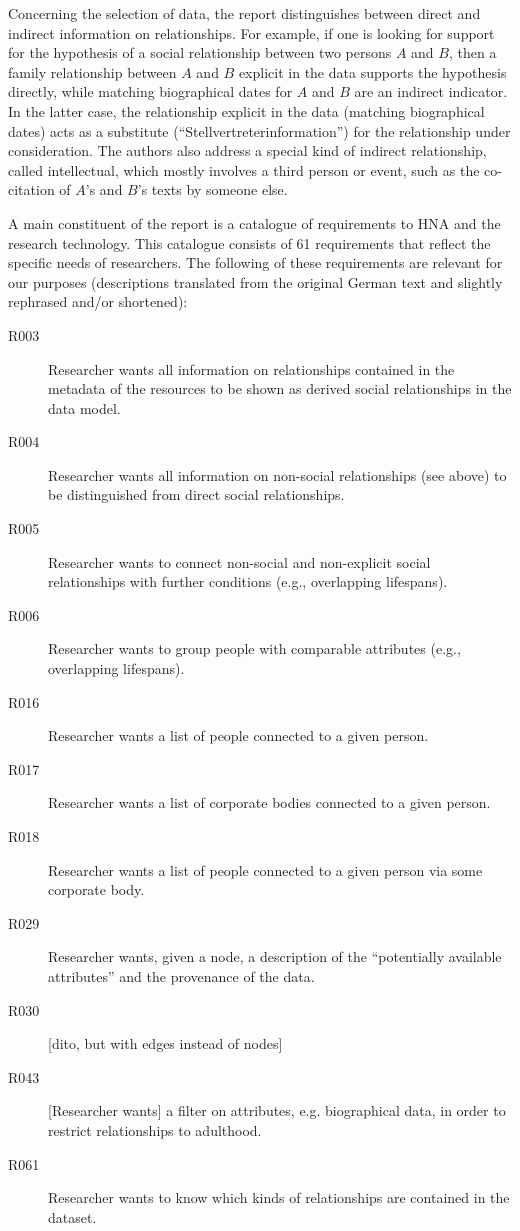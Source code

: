 
Concerning the selection of data, the report distinguishes between
direct and indirect information on relationships.
For example, if one is looking for support for the hypothesis of a social relationship
between two persons $A$ and $B$, then a family relationship between $A$ and $B$ explicit in the data
supports the hypothesis directly, while matching biographical dates for $A$ and $B$
are an indirect indicator. In the latter case, the relationship
explicit in the data (matching biographical dates) acts as a substitute
(\enquote{Stellvertreterinformation}) for the relationship under consideration.
The authors also address a special kind of indirect relationship,
called intellectual, which mostly involves a third person
or event, such as the co-citation of $A$'s and $B$'s texts by someone else.

A main constituent of the report is a catalogue of requirements
to HNA and the research technology. This catalogue consists of 61
requirements that reflect the specific needs of researchers.
The following of these requirements are relevant for our purposes
(descriptions translated from the original German text and slightly rephrased and/or shortened):
%
\begin{description}
  \item[R003]
    Researcher wants all information on relationships contained in the metadata of the resources
    to be shown as derived social relationships in the data model.
  \item[R004]
    Researcher wants all information on non-social
    relationships (see above) to be distinguished from direct social relationships.
  \item[R005]
    Researcher wants to connect non-social and non-explicit social relationships
    with further conditions (e.g., overlapping lifespans).
  \item[R006]
    Researcher wants to group people with comparable attributes (e.g., overlapping lifespans).
  \item[R016]
    Researcher wants a list of people connected to a given person.
  \item[R017]
    Researcher wants a list of corporate bodies connected to a given person.
  \item[R018]
    Researcher wants a list of people connected to a given person via some corporate body.
  \item[R029]
    Researcher wants, given a node, a description of the \enquote{potentially available attributes}
    and the provenance of the data.
  \item[R030]
    [dito, but with edges instead of nodes]
  \item[R043]
    [Researcher wants] a filter on attributes, e.g. biographical data, in order to
    restrict relationships to adulthood.
  \item[R061]
    Researcher wants to know which kinds of relationships are contained in the dataset.
\end{description}

